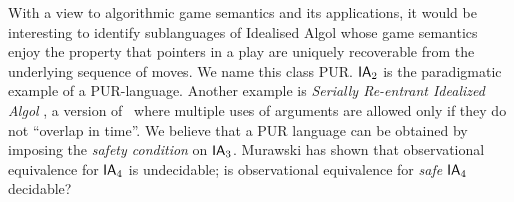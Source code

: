 With a view to algorithmic game semantics and its applications, it
would be interesting to identify sublanguages of Idealised Algol whose
game semantics enjoy the property that pointers in a play are uniquely
recoverable from the underlying sequence of moves. We name this class
PUR. $\textsf{IA}_2$ is the paradigmatic example of a
PUR-language. Another example is \emph{Serially Re-entrant Idealized
  Algol} \cite{abramsky:mchecking_ia}, a version of \ialgol\ where
multiple uses of arguments are allowed only if they do not ``overlap
in time''.  We believe that a PUR language can be obtained by imposing
the \emph{safety condition} on $\textsf{IA}_3$. Murawski \cite{Murawski2003} has
shown that observational equivalence for $\textsf{IA}_4$ is
undecidable; is observational equivalence for \emph{safe} $\textsf{IA}_4$
decidable?


